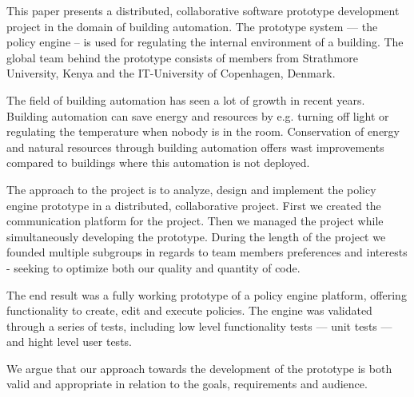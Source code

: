 This paper presents a distributed, collaborative software prototype development project in the domain of building automation. The prototype system --- the policy engine -- is used for regulating the internal environment of a building. The global team behind the prototype consists of members from Strathmore University, Kenya and the IT-University of Copenhagen, Denmark. 

The field of building automation has seen a lot of growth in recent years. Building automation can save energy and resources by e.g. turning off light or regulating the temperature when nobody is in the room. Conservation of energy and natural resources through building automation offers wast improvements compared to buildings where this automation is not deployed. 

The approach to the project is to analyze, design and implement the policy engine prototype in a distributed, collaborative project. First we created the communication platform for the project. Then we managed the project while simultaneously developing the prototype. During the length of the project we founded multiple subgroups in regards to team members preferences and interests - seeking to optimize both our quality and quantity of code.

The end result was a fully working prototype of a policy engine platform, offering functionality to create, edit and execute policies. The engine was validated through a series of tests, including low level functionality tests --- unit tests --- and hight level user tests. 

We argue that our approach towards the development of the prototype is both valid and appropriate in relation to the goals, requirements and audience.
